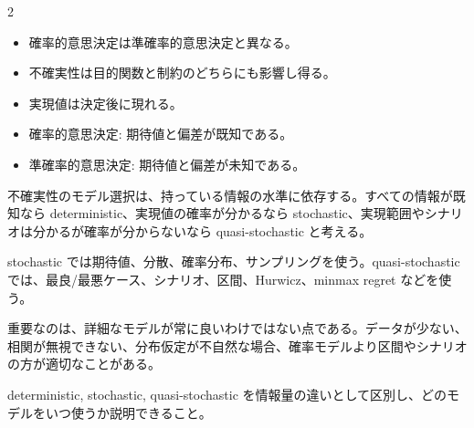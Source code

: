 \clearpage



\vspace{1.5mm}

\begin{multicols}{2}

\footnotesize

\raggedcolumns


\begin{itemize}
\item 確率的意思決定は準確率的意思決定と異なる。
\item 不確実性は目的関数と制約のどちらにも影響し得る。
\item 実現値は決定後に現れる。
\item 確率的意思決定: 期待値と偏差が既知である。
\item 準確率的意思決定: 期待値と偏差が未知である。
\end{itemize}

不確実性のモデル選択は、持っている情報の水準に依存する。すべての情報が既知なら deterministic、実現値の確率が分かるなら stochastic、実現範囲やシナリオは分かるが確率が分からないなら quasi-stochastic と考える。\par

stochastic では期待値、分散、確率分布、サンプリングを使う。quasi-stochastic では、最良/最悪ケース、シナリオ、区間、Hurwicz、minmax regret などを使う。\par

重要なのは、詳細なモデルが常に良いわけではない点である。データが少ない、相関が無視できない、分布仮定が不自然な場合、確率モデルより区間やシナリオの方が適切なことがある。\par

deterministic, stochastic, quasi-stochastic を情報量の違いとして区別し、どのモデルをいつ使うか説明できること。\par


\end{multicols}
